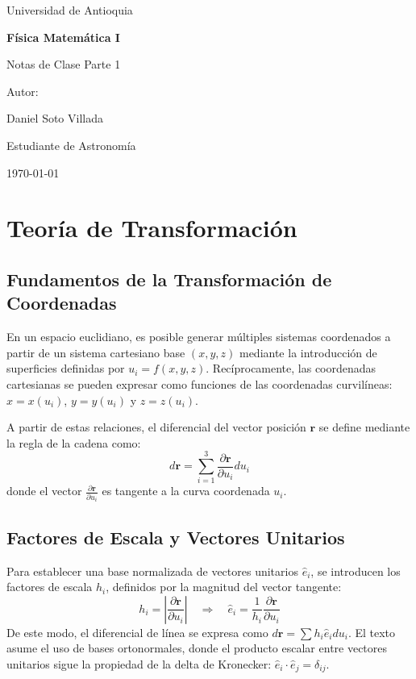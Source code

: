 \documentclass[a4paper]{article}
\begin{document}
\begin{titlepage}
  \centering
  {\Large Universidad de Antioquia\par}
  \vspace{2cm}
  {\huge\bfseries Física Matemática I\par}
  \vspace{0.4cm}
  {\Large Notas de Clase Parte 1\par}
  \vspace{2.5cm}
  {\large Autor:\par}
  \vspace{0.2cm}
  {\large Daniel Soto Villada\par}
  {\large Estudiante de Astronomía\par}
  \vfill
  {\large \today\par}
\end{titlepage}

\newpage
\tableofcontents
\newpage

\section{Teoría de Transformación}

\subsection{Fundamentos de la Transformación de Coordenadas}
En un espacio euclidiano, es posible generar múltiples sistemas coordenados a partir de un sistema cartesiano base $(x, y, z)$ mediante la introducción de superficies definidas por $u_i = f(x, y, z)$. Recíprocamente, las coordenadas cartesianas se pueden expresar como funciones de las coordenadas curvilíneas: $x = x(u_i)$, $y = y(u_i)$ y $z = z(u_i)$.

A partir de estas relaciones, el diferencial del vector posición $\mathbf{r}$ se define mediante la regla de la cadena como:
\begin{equation}
d\mathbf{r} = \sum_{i=1}^{3} \frac{\partial \mathbf{r}}{\partial u_i} du_i
\end{equation}
donde el vector $\frac{\partial \mathbf{r}}{\partial u_i}$ es tangente a la curva coordenada $u_i$.

\subsection{Factores de Escala y Vectores Unitarios}
Para establecer una base normalizada de vectores unitarios $\hat{e}_i$, se introducen los factores de escala $h_i$, definidos por la magnitud del vector tangente:
\begin{equation}
h_i = \left| \frac{\partial \mathbf{r}}{\partial u_i} \right| \quad \Rightarrow \quad \hat{e}_i = \frac{1}{h_i} \frac{\partial \mathbf{r}}{\partial u_i}
\end{equation}
De este modo, el diferencial de línea se expresa como $d\mathbf{r} = \sum h_i \hat{e}_i du_i$. El texto asume el uso de bases ortonormales, donde el producto escalar entre vectores unitarios sigue la propiedad de la delta de Kronecker: $\hat{e}_i \cdot \hat{e}_j = \delta_{ij}$.
\end{document}
